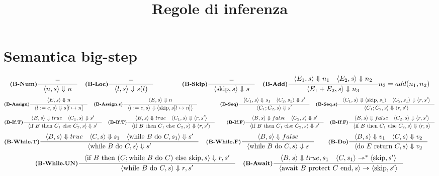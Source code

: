 \documentclass[a4paper, 10pt]{article}
\date{}
\title{\textbf{Regole di inferenza}}
\newcommand{\skipp}{\textup{skip}}
\theoremstyle{definition}
\newcommand{\infer}[4]{\inference[\textbf{#1}]{#2}{#3}#4 }
\newcommand{\brule}[2]{\langle #1 \rangle \Downarrow #2}
\newcommand{\srule}[2]{\langle #1 \rangle \rightarrowtriangle \langle #2 \rangle}
\newcommand{\ssrule}[2]{\langle #1 \rangle \rightarrowtriangle^{*} \langle #2 \rangle}
\newcommand{\memrep}[3]{#1 \lbrack #2 \mapsto #3 \rbrack}
\newcommand{\ifthenelse}[3]{\text{if } #1 \text{ then } #2 \text{ else } #3}
\newcommand{\whiledo}[2]{\text{while } #1 \text{ do } #2}
\newcommand{\doreturn}[2]{\text{do } #1 \text{ return } #2}
\newcommand{\awaitprotectend}[2]{\text{await } #1 \text{ protect } #2 \text{ end}}
\begin{document}
	\maketitle
	\section*{Semantica big-step}
	\begin{align*}
		&\infer{(B-Num)}{-}{\brule{n,s}{n}}{}	
		&\infer{(B-Loc)}{-}{\brule{l,s}{s(l)}}{}\qquad\qquad
		&\infer{(B-Skip)}{-}{\brule{\skipp,s}{s}}{} 
		&\infer{(B-Add)}{\brule{E_1,s}{n_1} \quad \brule{E_2,s}{n_2}}{\brule{E_1+E_2,s}{n_3}}{n_3 = add(n_1, n_2)}
	\end{align*}
	\begin{align*}
		&\infer{(B-Assign)}{\brule{E,s}{n}}{\brule{l:=e,s}{\memrep{s}{l}{n}}}{}  &\infer{(B-Assign.s)}{\brule{E,s}{n}}{\brule{l:=e,s}{\langle \skipp, \memrep{s}{l}{n}} \rangle}{} \qquad\qquad
		&\infer{(B-Seq)}{\brule{C_1,s}{s_1} \quad \brule{C_2,s_1}{s'} }{\brule{C_1;C_2,s}{s'}}{} 
		&\infer{(B-Seq.s)}{\brule{C_1,s}{\langle \skipp,s_1 \rangle} \quad \brule{C_2,s_1}{\langle r,s' \rangle} }{\brule{C_1;C_2,s}{\langle r,s' \rangle}}{}
	\end{align*}
	\begin{align*}
		&\infer{(B-If.T)}{\brule{B,s}{true} \quad \brule{C_1,s}{s'}}{\brule{\ifthenelse{B}{C_1}{C_2},s}{s'}}{} 
		&\infer{(B-If.T)}{\brule{B,s}{true} \quad \brule{C_1,s}{\langle r,
				s'\rangle}}{\brule{\ifthenelse{B}{C_1}{C_2},s}{\langle r, s'\rangle}}{} \qquad
		&\infer{(B-If.F)}{\brule{B,s}{false} \quad \brule{C_2,s}{s'}}{\brule{\ifthenelse{B}{C_1}{C_2},s}{s'}}{}
		&\infer{(B-If.F)}{\brule{B,s}{false} \quad \brule{C_2,s}{\langle r, s'\rangle}}{\brule{\ifthenelse{B}{C_1}{C_2},s}{\langle r, s\rangle}}{}
	\end{align*}
	\begin{align*}
		&\infer{(B-While.T)}{\brule{B, s}{true}\quad \brule{C, s}{s_1}\quad \brule{\whiledo{B}{C}, s_1}{s'}}{\brule{\whiledo{B}{C}, s}{s'}}{}
		&\infer{(B-While.F)}{\brule{B, s}{false}}{\brule{\whiledo{B}{C}, s}{s}}{} \qquad
		&\infer{(B-Do)}{\brule{B,s}{v_1}\quad \brule{C,s}{v_2}}{\brule{\doreturn{E}{C}, s}{v_2}}{}
	\end{align*}
	\begin{align*}
		&\infer{(B-While.UN)}{\brule{\ifthenelse{B}{(C;\whiledo{B}{C})}{\skipp}, s}{r, s'}}{\brule{\whiledo{B}{C}, s}{r, s'}}{}
		&\infer{(B-Await)}{\brule{B, s}{true, s_1}\quad \ssrule{C, s_1}{\skipp, s'}}{\srule{\awaitprotectend{B}{C}, s}{\skipp, s'}}{}
	\end{align*}
\end{document}
